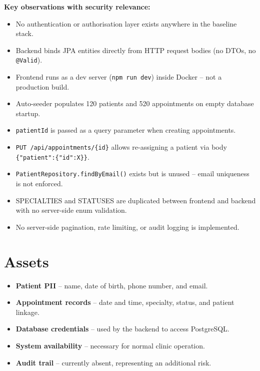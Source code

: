 \documentclass[12pt,a4paper]{report}
\begin{document}
\textbf{Key observations with security relevance:}
\begin{itemize}
  \item No authentication or authorisation layer exists anywhere in the baseline stack.
  \item Backend binds JPA entities directly from HTTP request bodies (no DTOs, no \texttt{@Valid}).
  \item Frontend runs as a dev server (\texttt{npm run dev}) inside Docker -- not a production build.
  \item Auto-seeder populates 120 patients and 520 appointments on empty database startup.
  \item \texttt{patientId} is passed as a query parameter when creating appointments.
  \item \texttt{PUT /api/appointments/\{id\}} allows re-assigning a patient via body \texttt{\{"patient":\{"id":X\}\}}.
  \item \texttt{PatientRepository.findByEmail()} exists but is unused -- email uniqueness is not enforced.
  \item SPECIALTIES and STATUSES are duplicated between frontend and backend with no server-side enum validation.
  \item No server-side pagination, rate limiting, or audit logging is implemented.
\end{itemize}

\section{Assets}

\begin{itemize}
  \item \textbf{Patient PII} -- name, date of birth, phone number, and email.
  \item \textbf{Appointment records} -- date and time, specialty, status, and patient linkage.
  \item \textbf{Database credentials} -- used by the backend to access PostgreSQL.
  \item \textbf{System availability} -- necessary for normal clinic operation.
  \item \textbf{Audit trail} -- currently absent, representing an additional risk.
\end{itemize}
\end{document}
